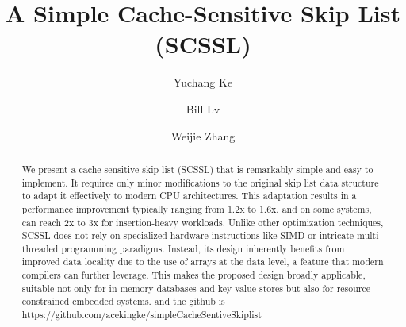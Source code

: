 \documentclass[sigconf, nonacm, letterpaper,top=2cm,bottom=2cm,left=3cm,right=3cm,marginparwidth=1.75cm]{acmart}
\begin{document}
\title{A Simple Cache-Sensitive Skip List (SCSSL)}

\author{Yuchang Ke}

\author{Bill Lv}

\author{Weijie Zhang}

\begin{abstract}
We present a cache-sensitive skip list (SCSSL) that is remarkably simple and easy to implement. It requires only minor modifications to the original skip list data structure to adapt it effectively to modern CPU architectures. This adaptation results in a performance improvement typically ranging from 1.2x to 1.6x, and on some systems, can reach 2x to 3x for insertion-heavy workloads.
Unlike other optimization techniques, SCSSL does not rely on specialized hardware instructions like SIMD or intricate multi-threaded programming paradigms. Instead, its design inherently benefits from improved data locality due to the use of arrays at the data level, a feature that modern compilers can further leverage. This makes the proposed design broadly applicable, suitable not only for in-memory databases and key-value stores but also for resource-constrained embedded systems. and the github is https://github.com/acekingke/simpleCacheSentiveSkiplist
\end{abstract}

\maketitle
\end{document}
